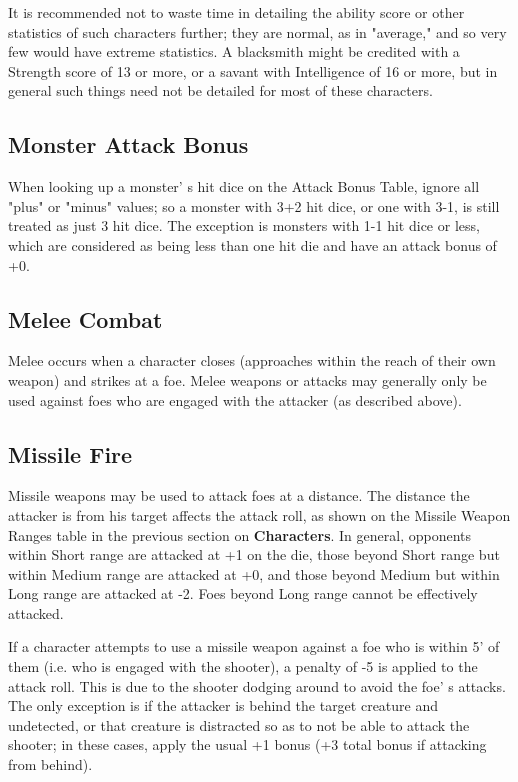 \documentclass[a4paper,twoside,openany,10pt]{book}
\begin{document}
\begin{multicols}{2}
It is recommended not to waste time in detailing the ability score or other statistics of such characters further; they are normal, as in "average," and so very few would have extreme statistics. A blacksmith might be credited with a Strength score of 13 or more, or a savant with Intelligence of 16 or more, but in general such things need not be detailed for most of these characters.

\subsection{Monster Attack Bonus}\label{monster-attack-bonus}

When looking up a monster' s hit dice on the Attack Bonus Table, ignore all "plus" or "minus" values; so a monster with 3+2 hit dice, or one with 3-1, is still treated as just 3 hit dice. The exception is monsters with 1-1 hit dice or less, which are considered as being less than one hit die and have an attack bonus of +0.

\subsection{Melee Combat}\label{melee-combat}

Melee occurs when a character closes (approaches within the reach of their own weapon) and strikes at a foe. Melee weapons or attacks may generally only be used against foes who are engaged with the attacker (as described above).

\subsection{Missile Fire}\label{missile-fire}

Missile weapons may be used to attack foes at a distance. The distance the attacker is from his target affects the attack roll, as shown on the Missile Weapon Ranges table in the previous section on \textbf{Characters}. In general, opponents within Short range are attacked at +1 on the die, those beyond Short range but within Medium range are attacked at +0, and those beyond Medium but within Long range are attacked at -2. Foes beyond Long range cannot be effectively attacked.

If a character attempts to use a missile weapon against a foe who is within 5' of them (i.e. who is engaged with the shooter), a penalty of -5 is applied to the attack roll. This is due to the shooter dodging around to avoid the foe' s attacks. The only exception is if the attacker is behind the target creature and undetected, or that creature is distracted so as to not be able to attack the shooter; in these cases, apply the usual +1 bonus (+3 total bonus if attacking from behind).


\end{multicols}
\end{document}
